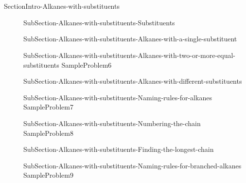 \documentclass[main.tex]{subfiles}
\newcommand\chapterlabel{Ch-orgo}\setcounter{figurenewcounter}{0}\setcounter{tablenewcounter}{0}\setcounter{formulanewcounter}{0}
\begin{document}
 
\section{\color{blue!30!black}{Alkanes with substituents}}
{SectionIntro-Alkanes-with-substituents}
\sloppy\begin{description}
\item[]{SubSection-Alkanes-with-substituents-Substituents}

\item[]{SubSection-Alkanes-with-substituents-Alkanes-with-a-single-substituent}

\hspace{4cm}{Table-Substituents}

\item[]{SubSection-Alkanes-with-substituents-Alkanes-with-two-or-more-equal-substituents}
{SampleProblem6}
\item[]{SubSection-Alkanes-with-substituents-Alkanes-with-different-substituents}
\item[]{SubSection-Alkanes-with-substituents-Naming-rules-for-alkanes}
{SampleProblem7}
\item[]{SubSection-Alkanes-with-substituents-Numbering-the-chain}
{SampleProblem8}
\item[]{SubSection-Alkanes-with-substituents-Finding-the-longest-chain}
\item[]{SubSection-Alkanes-with-substituents-Naming-rules-for-branched-alkanes}
{SampleProblem9}
\end{description}
\end{document}

